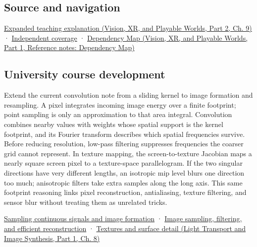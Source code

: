 \subsection{Source and navigation}\label{appendix-d5b3c692d9f0-source-and-navigation}

\hypertarget{appendix-d5b3c692d9f0-source-and-navigation}{}

\href{../07-Vision-XR-and-Playable-Worlds-P02/main.pdf\#nameddest=04-visual-computing-ii-ch042-a-footprint-is-more-meaningful-than-an-isolated-pixel-center}{Expanded teaching explanation (Vision, XR, and Playable Worlds, Part 2, Ch. 9)} · \hyperref[appendix-fd090d982a15-xr01---independent-seeing-and-representation-source]{Independent coverage} · \href{../07-Vision-XR-and-Playable-Worlds-P01/main.pdf\#nameddest=appendix-4ad47bdd269a}{Dependency Map (Vision, XR, and Playable Worlds, Part 1, Reference notes: Dependency Map)}

\subsection{University course development}\label{appendix-d5b3c692d9f0-university-course-development}

\hypertarget{appendix-d5b3c692d9f0-university-course-development}{}

Extend the current convolution note from a sliding kernel to image formation and resampling. A pixel integrates incoming image energy over a finite footprint; point sampling is only an approximation to that area integral. Convolution combines nearby values with weights whose spatial support is the kernel footprint, and its Fourier transform describes which spatial frequencies survive. Before reducing resolution, low-pass filtering suppresses frequencies the coarser grid cannot represent. In texture mapping, the screen-to-texture Jacobian maps a nearly square screen pixel to a texture-space parallelogram. If the two singular directions have very different lengths, an isotropic mip level blurs one direction too much; anisotropic filters take extra samples along the long axis. This same footprint reasoning links pixel reconstruction, antialiasing, texture filtering, and sensor blur without treating them as unrelated tricks.

\hyperref[03-visual-computing-i-ch003-sampling-continuous-signals-and-image-formation]{Sampling continuous signals and image formation} · \hyperref[03-visual-computing-i-ch004-image-sampling-filtering-and-efficient-reconstruction]{Image sampling, filtering, and efficient reconstruction} · \href{../04-Light-Transport-and-Image-Synthesis-P01/main.pdf\#nameddest=03-visual-computing-i-ch019-textures-and-surface-detail}{Textures and surface detail (Light Transport and Image Synthesis, Part 1, Ch. 8)}
